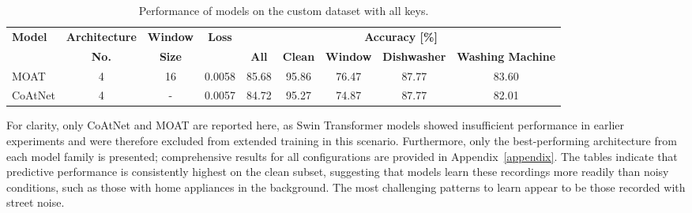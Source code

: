 \documentclass[a4paper,11pt,twoside]{report}
\theoremstyle{definition}
\begin{document}
\begin{table}[h!]
\centering
\caption{Performance of models on the custom dataset with all keys.}
\begin{adjustbox}{max width=\textwidth}
\begin{tabular}{l|c|c|c|ccccc}
\hline
\textbf{Model} & \textbf{Architecture} & \textbf{Window} & \textbf{Loss} & \multicolumn{5}{c}{\textbf{Accuracy [\%]}} \\
\cline{5-9}
       &   \textbf{No.}  &   \textbf{Size}   &   & \textbf{All} & \textbf{Clean} & \textbf{Window} & \textbf{Dishwasher} & \textbf{Washing Machine}  \\
\hline
MOAT & 4 & 16 & 0.0058 & 85.68 & 95.86 & 76.47 & 87.77 & 83.60 \\
CoAtNet & 4 & - & 0.0057 & 84.72 & 95.27 & 74.87 & 87.77 & 82.01 \\
\hline
\end{tabular}
\end{adjustbox}
\label{tab:custom_all_keys}
\end{table}


For clarity, only CoAtNet and MOAT are reported here, as Swin Transformer models showed insufficient performance in earlier experiments and were therefore excluded from extended training in this scenario. Furthermore, only the best-performing architecture from each model family is presented; comprehensive results for all configurations are provided in Appendix~\ref{appendix}. The tables indicate that predictive performance is consistently highest on the clean subset, suggesting that models learn these recordings more readily than noisy conditions, such as those with home appliances in the background. The most challenging patterns to learn appear to be those recorded with street noise.
\end{document}
